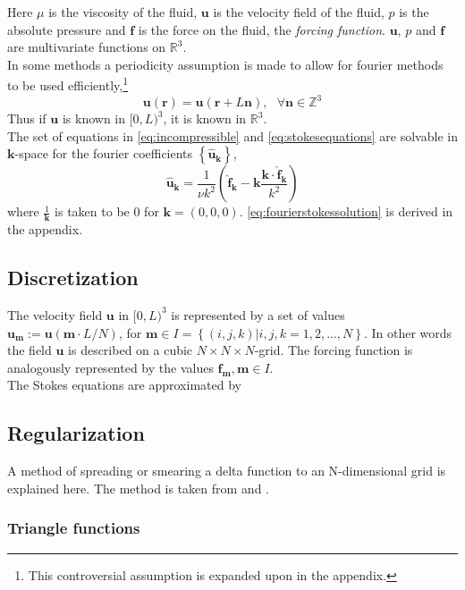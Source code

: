 \documentclass[a4paper,twoside=false,abstract=false,numbers=noenddot,
titlepage=false,headings=small,parskip=half,version=last]{scrartcl}
\begin{document}
Here $\mu$ is the viscosity of the fluid, $\mathbf{u}$ is the velocity field of the fluid, $p$ is the absolute pressure and $\mathbf{f}$ is the force on the fluid, the \emph{forcing function}. $\mathbf{u}$, $p$ and $\mathbf{f}$ are multivariate functions on $\mathbb{R}^3$.\\

In some methods a periodicity assumption is made to allow for fourier methods to be used efficiently,\footnote{This controversial assumption is expanded upon in the appendix.}
\begin{equation}
\mathbf{u}(\mathbf{r}) = \mathbf{u}(\mathbf{r}+L\mathbf{n}),\text{ }\forall \mathbf{n} \in \mathbb{Z}^3
\end{equation}
Thus if $\mathbf{u}$ is known in $[0,L)^3$, it is known in $\mathbb{R}^3$.\\
The set of equations in \eqref{eq:incompressible} and \eqref{eq:stokesequations} are solvable in $\mathbf{k}$-space for the fourier coefficients $\left\{\hat{\mathbf{u}}_\mathbf{k}\right\}$,
\begin{equation}
\hat{\mathbf{u}}_\mathbf{k} = \frac{1}{\nu k^2} \left( \hat{\mathbf{f}}_\mathbf{k} - \mathbf{k} \frac{\mathbf{k}\cdot \hat{\mathbf{f}}_\mathbf{k}}{k^2} \right) \label{eq:fourierstokessolution}
\end{equation}
where $\frac{1}{\mathbf{k}}$ is taken to be $0$ for $\mathbf{k}=(0,0,0)$. \eqref{eq:fourierstokessolution} is derived in the appendix.
\subsection{Discretization}
The velocity field $\mathbf{u}$ in $[0,L)^3$ is represented by a set of values $\mathbf{u}_\mathbf{m}:=\mathbf{u}(\mathbf{m}\cdot L/N)$, for $\mathbf{m}\in I = \left\{(i,j,k) | i,j,k=1,2,...,N\right\}$.
In other words the field $\mathbf{u}$ is described on a cubic $N\times N\times N$-grid.
The forcing function is analogously represented by the values $\mathbf{f}_\mathbf{m}, \mathbf{m}\in I$.\\
The Stokes equations are approximated by 

\subsection{Regularization}
A method of spreading or smearing a delta function to an N-dimensional grid is explained here. The method is taken from \cite{spectralewald} and \cite{interfaceregularization}.
\subsubsection{Triangle functions}
\end{document}
